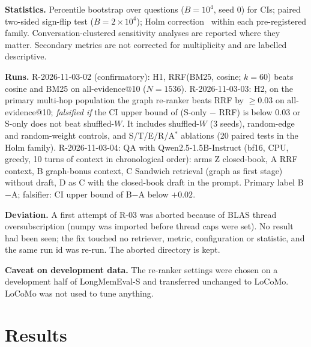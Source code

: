 \documentclass[10pt]{article}
\begin{document}
\textbf{Statistics.} Percentile bootstrap over questions ($B=10^4$, seed 0) for CIs; paired two-sided sign-flip test ($B=2\times10^4$); Holm correction~\cite{holm1979} within each pre-registered family. Conversation-clustered sensitivity analyses are reported where they matter. Secondary metrics are not corrected for multiplicity and are labelled descriptive.

\textbf{Runs.} R-2026-11-03-02 (confirmatory): H1, RRF(BM25, cosine; $k{=}60$) beats cosine and BM25 on all-evidence@10 ($N{=}1536$). R-2026-11-03-03: H2, on the primary multi-hop population the graph re-ranker beats RRF by $\ge0.03$ on all-evidence@10; \emph{falsified if} the CI upper bound of (S-only $-$ RRF) is below $0.03$ or S-only does not beat shuffled-$W$. It includes shuffled-$W$ (3 seeds), random-edge and random-weight controls, and S/T/E/R/A$^*$ ablations (20 paired tests in the Holm family). R-2026-11-03-04: QA with Qwen2.5-1.5B-Instruct \cite{qwen2024qwen25} (bf16, CPU, greedy, 10 turns of context in chronological order): arms Z closed-book, A RRF context, B graph-bonus context, C Sandwich retrieval (graph as first stage) without draft, D as C with the closed-book draft in the prompt. Primary label B$-$A; falsifier: CI upper bound of B$-$A below $+0.02$.

\textbf{Deviation.} A first attempt of R-03 was aborted because of BLAS thread oversubscription (numpy was imported before thread caps were set). No result had been seen; the fix touched no retriever, metric, configuration or statistic, and the same run id was re-run. The aborted directory is kept.

\textbf{Caveat on development data.} The re-ranker settings were chosen on a development half of LongMemEval-S and transferred unchanged to LoCoMo. LoCoMo was not used to tune anything.

\section{Results}\label{sec:results}
\end{document}
